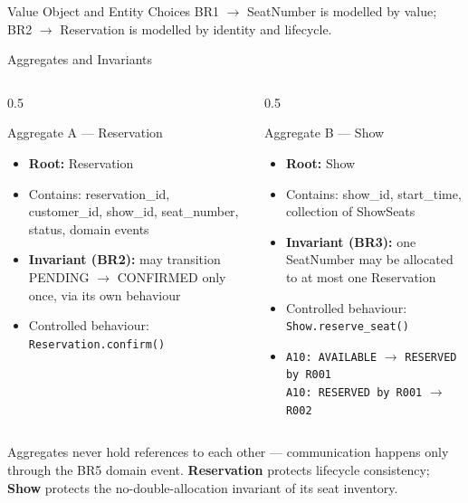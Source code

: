 \documentclass[aspectratio=169,11pt]{beamer}
\newcommand{\code}[1]{\texttt{#1}}
\begin{document}
\begin{frame}{Value Object and Entity Choices}
  \vspace{0.15cm}
  {\scriptsize BR1 $\rightarrow$ SeatNumber is modelled by value; BR2 $\rightarrow$
  Reservation is modelled by identity and lifecycle.}
\end{frame}

\begin{frame}{Aggregates and Invariants}
  \begin{columns}[t]
    \begin{column}{0.5\textwidth}
      \begin{block}{Aggregate A --- Reservation}
        \scriptsize
        \begin{itemize}
          \item \textbf{Root:} Reservation
          \item Contains: reservation\_id, customer\_id, show\_id,
                seat\_number, status, domain events
          \item \textbf{Invariant (BR2):} may transition PENDING $\rightarrow$
                CONFIRMED only once, via its own behaviour
          \item Controlled behaviour: \code{Reservation.confirm()}
        \end{itemize}
      \end{block}
    \end{column}
    \begin{column}{0.5\textwidth}
      \begin{block}{Aggregate B --- Show}
        \scriptsize
        \begin{itemize}
          \item \textbf{Root:} Show
          \item Contains: show\_id, start\_time, collection of ShowSeats
          \item \textbf{Invariant (BR3):} one SeatNumber may be allocated to
                at most one Reservation
          \item Controlled behaviour: \code{Show.reserve\_seat()}
          \item \code{A10: AVAILABLE} $\rightarrow$ \code{RESERVED by R001} \checkmark \\
                \code{A10: RESERVED by R001} $\rightarrow$ \code{R002} 
        \end{itemize}
      \end{block}
    \end{column}
  \end{columns}

  \vspace{0.15cm}
  {\scriptsize Aggregates never hold references to each other --- communication
  happens only through the BR5 domain event. \textbf{Reservation} protects
  lifecycle consistency; \textbf{Show} protects the no-double-allocation
  invariant of its seat inventory.}
\end{frame}
\end{document}
